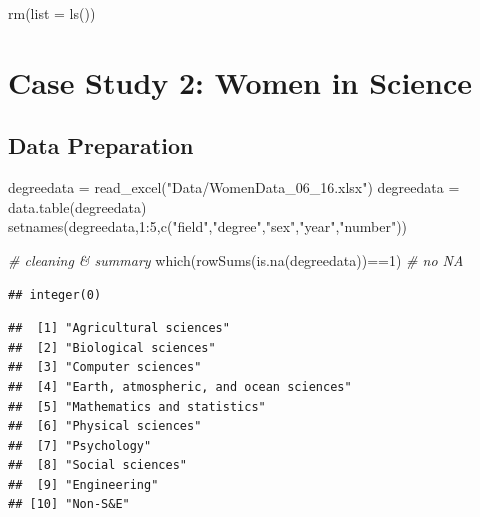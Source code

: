 \documentclass[
  12pt,
]{article}
\newenvironment{Shaded}{\begin{snugshade}}{\end{snugshade}}
\newcommand{\AttributeTok}[1]{\textcolor[rgb]{0.77,0.63,0.00}{#1}}
\newcommand{\CommentTok}[1]{\textcolor[rgb]{0.56,0.35,0.01}{\textit{#1}}}
\newcommand{\DecValTok}[1]{\textcolor[rgb]{0.00,0.00,0.81}{#1}}
\newcommand{\FunctionTok}[1]{\textcolor[rgb]{0.00,0.00,0.00}{#1}}
\newcommand{\NormalTok}[1]{#1}
\newcommand{\OtherTok}[1]{\textcolor[rgb]{0.56,0.35,0.01}{#1}}
\newcommand{\SpecialCharTok}[1]{\textcolor[rgb]{0.00,0.00,0.00}{#1}}
\newcommand{\StringTok}[1]{\textcolor[rgb]{0.31,0.60,0.02}{#1}}
\begin{document}
\begin{Shaded}
\begin{Highlighting}[]
\FunctionTok{rm}\NormalTok{(}\AttributeTok{list =} \FunctionTok{ls}\NormalTok{())}
\end{Highlighting}
\end{Shaded}

\hypertarget{case-study-2-women-in-science}{%
\section{Case Study 2: Women in
Science}\label{case-study-2-women-in-science}}

\hypertarget{data-preparation-1}{%
\subsection{Data Preparation}\label{data-preparation-1}}

\begin{Shaded}
\begin{Highlighting}[]
\NormalTok{degreedata }\OtherTok{=} \FunctionTok{read\_excel}\NormalTok{(}\StringTok{"Data/WomenData\_06\_16.xlsx"}\NormalTok{)}
\NormalTok{degreedata }\OtherTok{=} \FunctionTok{data.table}\NormalTok{(degreedata)}
\FunctionTok{setnames}\NormalTok{(degreedata,}\DecValTok{1}\SpecialCharTok{:}\DecValTok{5}\NormalTok{,}\FunctionTok{c}\NormalTok{(}\StringTok{"field"}\NormalTok{,}\StringTok{"degree"}\NormalTok{,}\StringTok{"sex"}\NormalTok{,}\StringTok{"year"}\NormalTok{,}\StringTok{"number"}\NormalTok{))}

\CommentTok{\# cleaning \& summary}
\FunctionTok{which}\NormalTok{(}\FunctionTok{rowSums}\NormalTok{(}\FunctionTok{is.na}\NormalTok{(degreedata))}\SpecialCharTok{==}\DecValTok{1}\NormalTok{) }\CommentTok{\# no NA}
\end{Highlighting}
\end{Shaded}

\begin{verbatim}
## integer(0)
\end{verbatim}

\begin{Shaded}
\end{Shaded}

\begin{verbatim}
##  [1] "Agricultural sciences"                 
##  [2] "Biological sciences"                   
##  [3] "Computer sciences"                     
##  [4] "Earth, atmospheric, and ocean sciences"
##  [5] "Mathematics and statistics"            
##  [6] "Physical sciences"                     
##  [7] "Psychology"                            
##  [8] "Social sciences"                       
##  [9] "Engineering"                           
## [10] "Non-S&E"
\end{verbatim}
\end{document}
